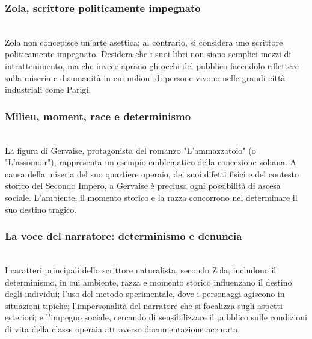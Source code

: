 \documentclass{report}
\begin{document}
\subsubsection{Zola, scrittore politicamente impegnato}
\\
Zola non concepisce un'arte asettica; al contrario, si considera uno scrittore politicamente impegnato. Desidera che i suoi libri non siano semplici mezzi di intrattenimento, ma che invece aprano gli occhi del pubblico facendolo riflettere sulla miseria e disumanità in cui milioni di persone vivono nelle grandi città industriali come Parigi.
\\
\subsubsection{Milieu, moment, race e determinismo}
\\
La figura di Gervaise, protagonista del romanzo "L'ammazzatoio" (o "L'assomoir"), rappresenta un esempio emblematico della concezione zoliana. A causa della miseria del suo quartiere operaio, dei suoi difetti fisici e del contesto storico del Secondo Impero, a Gervaise è preclusa ogni possibilità di ascesa sociale. L'ambiente, il momento storico e la razza concorrono nel determinare il suo destino tragico.
\\
\subsubsection{La voce del narratore: determinismo e denuncia}
\\
I caratteri principali dello scrittore naturalista, secondo Zola, includono il determinismo, in cui ambiente, razza e momento storico influenzano il destino degli individui; l'uso del metodo sperimentale, dove i personaggi agiscono in situazioni tipiche; l'impersonalità del narratore che si focalizza sugli aspetti esteriori; e l'impegno sociale, cercando di sensibilizzare il pubblico sulle condizioni di vita della classe operaia attraverso documentazione accurata.
\\
\end{document}

